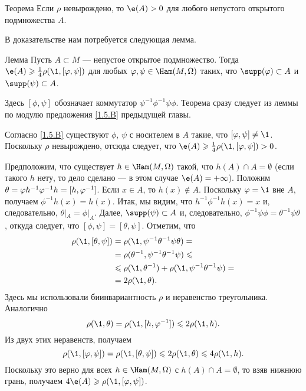 \begin{thm}[(\cite{EP})]{Теорема}\label{2.4.A}
Если $\rho$ невырождено, то $\e (A)> 0$ для любого непустого открытого подмножества $A$.
\end{thm}

В доказательстве нам потребуется следующая лемма.

\begin{thm}{Лемма}\label{2.4.B}
Пусть $A \subset M$ --- непустое открытое подмножество.
Тогда $\e (A) \ge \tfrac14 \rho (\1, [\phi, \psi])$ для любых $\phi, \psi \in \Ham (M, \Omega)$ таких, что $\supp (\phi) \subset A$ и $\supp (\psi) \subset A$.
\end{thm}

Здесь $[\phi, \psi]$ обозначает коммутатор $\psi^{-1} \phi^{-1} \psi\phi$.
Теорема сразу следует из леммы по модулю предложения \ref{1.5.B} предыдущей главы.

Согласно \ref{1.5.B} существуют $\phi$, $\psi$ с носителем в $A$ такие, что $[\phi, \psi] \ne \1$.
Поскольку $\rho$ невырождено, отсюда следует, что $\e (A) \ge \tfrac14 \rho (\1, [\phi, \psi])> 0$.
\qeds

Предположим, что существует $h \in \Ham (M, \Omega)$ такой, что $h (A) \cap A = \emptyset$ (если такого $h$ нету, то дело сделано --- в этом случае $\e (A) = + \infty$).
Положим $\theta = \phi h^{-1} \phi^{-1} h \z= [h, \phi^{-1}]$.
Если $x \in A$, то $h (x) \notin A$.
Поскольку $\phi = \1$ вне $A$, получаем $\phi^{-1} h (x) = h (x)$.
Итак, мы видим, что $h^{-1} \phi^{-1} h (x) = x$ и, следовательно, $\theta|_A = \phi|_A$.
Далее, $\supp (\psi) \subset A$ и, следовательно, $\phi^{-1} \psi\phi = \theta^{-1} \psi\theta$, откуда следует, что $[\phi, \psi] = [\theta, \psi]$.
Отметим, что 
\begin{align*}
\rho (\1, [\theta, \psi]) &= \rho (\1, \psi^{-1} \theta^{-1} \psi\theta) =
\\
&=\rho (\theta^{-1}, \psi^{-1} \theta^{-1} \psi) \le
\\
&\le \rho (\1, \theta^{-1}) + \rho (\1, \psi^{-1} \theta^{-1} \psi) =
\\
&= 2\rho (\1, \theta).
\end{align*}
Здесь мы использовали биинвариантность $\rho$ и неравенство треугольника.
Аналогично 
\[\rho (\1, \theta) = \rho (\1, [h, \phi^{-1}]) \le 2\rho (\1, h).\]
Из двух этих неравенств, получаем 
\[\rho (\1, [\phi, \psi]) = \rho (\1, [\theta, \psi]) \le 2\rho (\1, \theta) \le 4\rho (\1, h).\]
Поскольку это верно для всех $h \in \Ham (M, \Omega)$ с $h (A) \cap A =\emptyset$, то взяв нижнюю грань, получаем $4\e (A) \ge \rho (\1, [\phi, \psi])$.
\qeds

